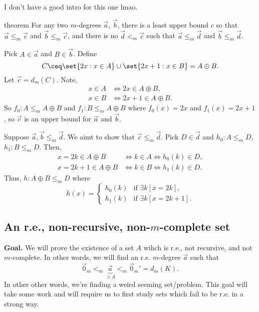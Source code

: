 \documentclass[class=article, crop=false]{standalone}
\begin{document}
I don't have a good intro for this one lmao.
\begin{result}{theorem}
  For any two $m$-degrees $\vec a$, $\vec b$, there is a least upper bound $c$ so that $\vec a \leq_m \vec c$ and $\vec b \leq_m \vec c$, and there is no $\vec d<_m \vec c$ such that $\vec a \leq_m \vec d$ and $\vec b \leq_m \vec d$.
\end{result}
\begin{pf}
  Pick $A \in \vec a$ and $B \in \vec b$. Define
    \[
      C \ceq \set{2x : x \in A} \cup \set{2x+1: x \in B} = A \oplus B.
    \]
  Let $\vec c = d_m(C)$. Note,
    \begin{align*}
      x \in A &\iff 2x \in A \oplus B, \\
      x \in B &\iff 2x+1 \in A \oplus B.
    \end{align*}
  So $f_0 \colon A \leq_m A \oplus B$ and $f_1 \colon B \leq_m A \oplus B$ where $f_0(x) =2x$ and $f_1(x) = 2x+1$, so $\vec c$ is an upper bound for $\vec a$ and $\vec b$.

  Suppose $\vec a, \vec b \leq_m \vec d$. We aimt to show that $\vec c \leq_m\vec d$. Pick $D \in \vec d$ and $h_0 \colon A \leq_m D$, $h_1 \colon B \leq_m D$. Then,
    \begin{align*}
      x = 2k \in A \oplus B &\iff k \in A \iff h_0(k) \in D, \\
      x = 2k+1 \in A \oplus B &\iff k \in B \iff h_1(k) \in D.
    \end{align*}
  Thus, $h\colon A \oplus B \leq_m D$ where
    \[
      h(x) =
        \begin{cases}
          h_0(k) &\text{if } \exists k [x=2k], \\
          h_1(k) &\text{if } \exists k [x=2k+1].
        \end{cases}
    \]
\end{pf}










\subsection{An r.e., non-recursive, non-$m$-complete set}
\textbf{Goal.} We will prove the existence of a set $A$ wihch is r.e., not recursive, and not $m$-complete. In other words, we will find an r.e. $m$-degree $\vec a$ such that
  \[
    \vec 0_m <_m \underbrace{\vec a}_{\ni A} <_m \vec 0_m' = d_m(K).
  \]
In other other words, we're finding a weird seeming set/problem. This goal will take some work and will require us to first study sets which fail to be r.e. in a strong way.
\end{document}
